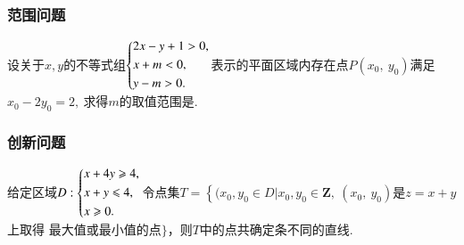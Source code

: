 \documentclass{BHCexam}
\begin{document}
\subsubsection{范围问题}
\begin{example}
设关于$ x,y $的不等式组$\begin{dcases}
2x-y+1>0,\\
x+m<0,\\
y-m>0.
\end{dcases}$表示的平面区域内存在点$ P(x_0,~y_0) $满足$ x_0-2y_0=2,~ $求得$ m $的取值范围是\tk.
\end{example}

\subsubsection{创新问题}
\begin{example}
给定区域$ D:\begin{dcases}
x+4y\ge 4,\\
x+y\le 4,\\
x\ge 0.
\end{dcases} $令点集$ T=\left\{(x_0,y_0\in D|x_0,y_0\in \mathbf{Z},~(x_0,~y_0)\text{是}z=x+y\right.$上取得 最大值或最小值的点$\big\} $，则$ T $中的点共确定\tk 条不同的直线.
\end{example}
\end{document}
